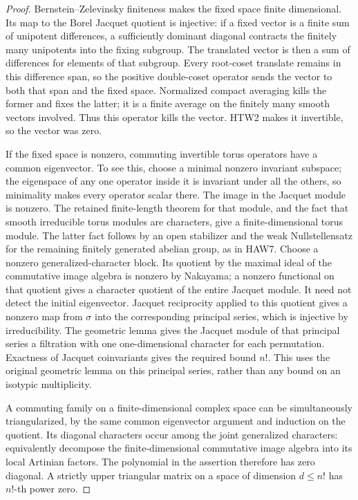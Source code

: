 \begin{proof}
Bernstein--Zelevinsky finiteness makes the fixed space finite
dimensional.  Its map to the Borel Jacquet quotient is
injective: if a fixed vector is a finite sum of unipotent
differences, a sufficiently dominant diagonal contracts
the finitely many unipotents into the fixing subgroup.
The translated vector is then a sum of differences
for elements of that subgroup.  Every root-coset
translate remains in this difference span, so the
positive double-coset operator sends the vector to
both that span and the fixed space.  Normalized
compact averaging kills the former and fixes the
latter; it is a finite average on the finitely
many smooth vectors involved.  Thus this operator
kills the vector.  HTW2 makes it invertible, so
the vector was zero.

If the fixed space is nonzero, commuting invertible torus
operators have a common eigenvector.  To see this, choose
a minimal nonzero invariant subspace; the eigenspace of
any one operator inside it is invariant under all the
others, so minimality makes every operator scalar there.
The image in the Jacquet module is nonzero.
The retained finite-length theorem for that module,
and the fact that smooth irreducible torus modules
are characters, give a finite-dimensional torus
module.  The latter fact follows by an open
stabilizer and the weak Nullstellensatz for the
remaining finitely generated abelian group, as
in HAW7.  Choose a nonzero generalized-character
block.  Its quotient by the maximal ideal of the
commutative image algebra is nonzero by Nakayama;
a nonzero functional on that quotient gives a
character quotient of the entire Jacquet module.
It need not detect the initial eigenvector.
Jacquet reciprocity applied to this quotient
gives a nonzero map from \(\sigma\) into the
corresponding principal series, which is injective
by irreducibility.  The geometric lemma gives the Jacquet
module of that principal series a filtration with one
one-dimensional character for each permutation.  Exactness
of Jacquet coinvariants gives the required bound \(n!\).
This uses the original geometric lemma on this principal
series, rather than any bound on an isotypic multiplicity.

A commuting family on a finite-dimensional complex space
can be simultaneously triangularized, by the same common
eigenvector argument and induction on the quotient.  Its
diagonal characters occur among the joint generalized
characters: equivalently decompose the finite-dimensional
commutative image algebra into its local Artinian factors.
The polynomial in the assertion therefore has zero
diagonal.  A strictly upper triangular matrix on a space
of dimension \(d\le n!\) has \(n!\)-th power zero.


\end{proof}

